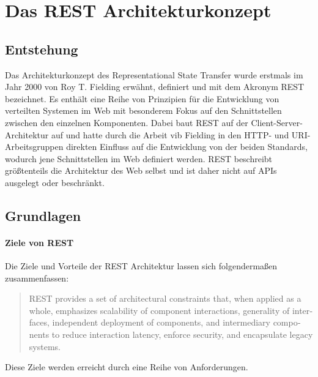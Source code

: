 \chapter{Das REST Architekturkonzept}
\section{Entstehung}
Das Architekturkonzept des Representational State Transfer wurde erstmals im Jahr 2000 von Roy T. Fielding erwähnt, definiert und mit dem Akronym REST bezeichnet.\cite[76]{REST}
Es enthält eine Reihe von Prinzipien für die Entwicklung von verteilten Systemen im Web mit besonderem Fokus auf den Schnittstellen zwischen den einzelnen Komponenten.
Dabei baut REST auf der Client-Server-Architektur auf und hatte durch die Arbeit vib Fielding in den HTTP- und URI-Arbeitsgruppen direkten Einfluss auf die Entwicklung von der beiden Standards, wodurch jene Schnittstellen im Web definiert werden.\cite[vgl.][4,105f.]{REST}
REST beschreibt größtenteils die Architektur des Web selbst und ist daher nicht auf APIs ausgelegt oder beschränkt\cite[vgl.][1]{Tilkov}.

\section{Grundlagen}
\subsubsection{Ziele von REST}
Die Ziele und Vorteile der REST Architektur lassen sich folgendermaßen zusammenfassen:
\foreignblockcquote{english}[105]{REST}{REST provides a set of architectural constraints that, when applied as a whole, emphasizes scalability of component interactions, generality of interfaces, independent deployment of components, and intermediary components to reduce interaction latency, enforce security, and encapsulate  legacy  systems.}
Diese Ziele werden erreicht durch eine Reihe von Anforderungen.
